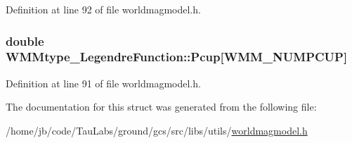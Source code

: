\-Definition at line 92 of file worldmagmodel.\-h.

\hypertarget{struct_w_m_mtype___legendre_function_a5badc4162d0641c9de51a11bf49d2f71}{
\subsubsection[{\-Pcup}]{\setlength{\rightskip}{0pt plus 5cm}double {\bf \-W\-M\-Mtype\-\_\-\-Legendre\-Function\-::\-Pcup}\mbox{[}\-W\-M\-M\-\_\-\-N\-U\-M\-P\-C\-U\-P\mbox{]}}}\label{struct_w_m_mtype___legendre_function_a5badc4162d0641c9de51a11bf49d2f71}


\-Definition at line 91 of file worldmagmodel.\-h.



\-The documentation for this struct was generated from the following file\-:\begin{DoxyCompactItemize}
\item 
/home/jb/code/\-Tau\-Labs/ground/gcs/src/libs/utils/\hyperlink{worldmagmodel_8h}{worldmagmodel.\-h}\end{DoxyCompactItemize}
